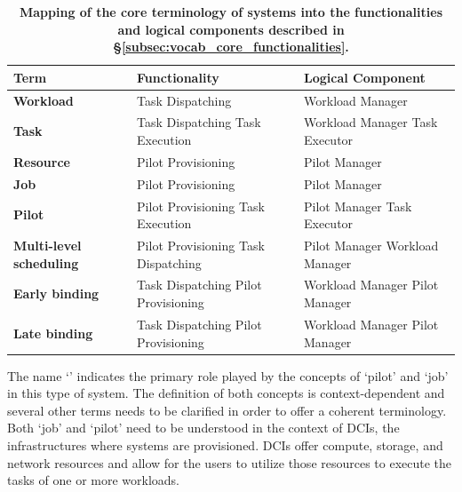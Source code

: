 \documentclass{sig-alternate}
\begin{document}
\begin{table}
 \centering
 \begin{tabular}{|p{4cm}|p{3.2cm}|p{3.2cm}|}
  \hline
    \textbf{Term} & \textbf{Functionality} & \textbf{Logical Component} \\
  \hline
  \hline
    \textbf{Workload} & Task Dispatching & Workload Manager \\
  \hline
    \textbf{Task} & Task Dispatching \newline Task Execution & Workload Manager \newline Task Executor \\
  \hline
    \textbf{Resource} & Pilot Provisioning & Pilot Manager \\
  \hline
    \textbf{Job} & Pilot Provisioning & Pilot Manager \\
  \hline
    \textbf{Pilot} & Pilot Provisioning \newline Task Execution & Pilot Manager \newline Task Executor \\
  \hline
    \textbf{Multi-level scheduling} & Pilot Provisioning \newline Task Dispatching & Pilot Manager \newline Workload Manager \\
  \hline
    \textbf{Early binding} & Task Dispatching \newline Pilot Provisioning & Workload Manager  \newline Pilot Manager\\
  \hline
    \textbf{Late binding} & Task Dispatching \newline Pilot Provisioning  & Workload Manager \newline Pilot Manager\\
  \hline
 \end{tabular}
 \caption{\textbf{Mapping of the core terminology of \pilot systems into
  the functionalities and logical components described in
  \S\ref{subsec:vocab_core_functionalities}.}\up}
 \label{table:terminology}
\end{table}


The name `\pilotjob' indicates the primary role played by the concepts
of `pilot' and `job' in this type of system. The definition of both
concepts is context-dependent and several other terms needs to be
clarified in order to offer a coherent terminology. Both `job' and
`pilot' need to be understood in the context of DCIs, the
infrastructures where \pilotjobs systems are provisioned. DCIs offer
compute, storage, and network resources and \pilotjobs allow for the
users to utilize those resources to execute the tasks of one or more
workloads.
\end{document}
